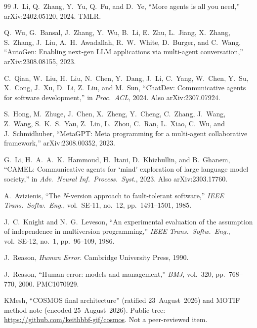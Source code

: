 \documentclass[11pt]{article}
\begin{document}
\begin{thebibliography}{99}
J.~Li, Q.~Zhang, Y.~Yu, Q.~Fu, and D.~Ye,
``More agents is all you need,''
arXiv:2402.05120, 2024. TMLR.

Q.~Wu, G.~Bansal, J.~Zhang, Y.~Wu, B.~Li, E.~Zhu, L.~Jiang, X.~Zhang, S.~Zhang, J.~Liu, A.~H.~Awadallah, R.~W.~White, D.~Burger, and C.~Wang,
``AutoGen: Enabling next-gen LLM applications via multi-agent conversation,''
arXiv:2308.08155, 2023.

C.~Qian, W.~Liu, H.~Liu, N.~Chen, Y.~Dang, J.~Li, C.~Yang, W.~Chen, Y.~Su, X.~Cong, J.~Xu, D.~Li, Z.~Liu, and M.~Sun,
``ChatDev: Communicative agents for software development,''
in \emph{Proc.\ ACL}, 2024.
Also arXiv:2307.07924.

S.~Hong, M.~Zhuge, J.~Chen, X.~Zheng, Y.~Cheng, C.~Zhang, J.~Wang, Z.~Wang, S.~K.~S.~Yau, Z.~Lin, L.~Zhou, C.~Ran, L.~Xiao, C.~Wu, and J.~Schmidhuber,
``MetaGPT: Meta programming for a multi-agent collaborative framework,''
arXiv:2308.00352, 2023.

G.~Li, H.~A.~A.~K.~Hammoud, H.~Itani, D.~Khizbullin, and B.~Ghanem,
``CAMEL: Communicative agents for `mind' exploration of large language model society,''
in \emph{Adv.\ Neural Inf.\ Process.\ Syst.}, 2023.
Also arXiv:2303.17760.

A.~Avizienis,
``The $N$-version approach to fault-tolerant software,''
\emph{IEEE Trans.\ Softw.\ Eng.}, vol.~SE-11, no.~12, pp.~1491--1501, 1985.

J.~C.~Knight and N.~G.~Leveson,
``An experimental evaluation of the assumption of independence in multiversion programming,''
\emph{IEEE Trans.\ Softw.\ Eng.}, vol.~SE-12, no.~1, pp.~96--109, 1986.

J.~Reason,
\emph{Human Error}.
Cambridge University Press, 1990.

J.~Reason,
``Human error: models and management,''
\emph{BMJ}, vol.~320, pp.~768--770, 2000.
PMC1070929.

KMesh,
``COSMOS final architecture'' (ratified 23~August~2026)
and MOTIF method note (encoded 25~August~2026).
Public tree: \url{https://github.com/keithbbf-gif/cosmos}.
Not a peer-reviewed item.

\end{thebibliography}
\end{document}
